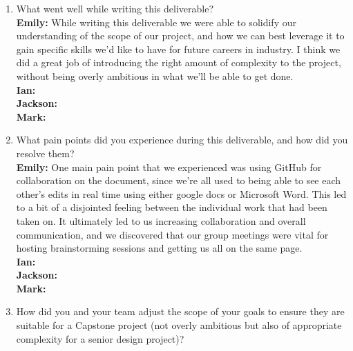 \documentclass{article}
\begin{document}



\begin{enumerate}
    \item What went well while writing this deliverable? \\
    \textbf{Emily:} While writing this deliverable we were able to solidify our understanding of the scope of our project, and how we can best leverage it to 
                    gain specific skills we’d like to have for future careers in industry. I think we did a great job of introducing the right amount of 
                    complexity to the project, without being overly ambitious in what we’ll be able to get done.\\
    \textbf{Ian:} \\
    \textbf{Jackson:} \\
    \textbf{Mark:} \\

    \item What pain points did you experience during this deliverable, and how
    did you resolve them?\\
    \textbf{Emily:} One main pain point that we experienced was using GitHub for collaboration on the document, since we’re all used to being able to see each 
                    other’s edits in real time using either google docs or Microsoft Word. This led to a bit of a disjointed feeling between the individual work 
                    that had been taken on. It ultimately led to us increasing collaboration and overall communication, and we discovered that our group meetings 
                    were vital for hosting brainstorming sessions and getting us all on the same page. \\
    \textbf{Ian:} \\
    \textbf{Jackson:} \\
    \textbf{Mark:} \\

    \item How did you and your team adjust the scope of your goals to ensure
    they are suitable for a Capstone project (not overly ambitious but also of
    appropriate complexity for a senior design project)?
\end{enumerate}  
\end{document}
